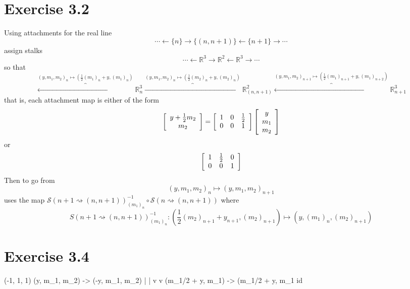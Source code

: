 \documentclass{letter}
\begin{document}
  \section*{Exercise 3.2}
  Using attachments for the real line
  $$
  \cdots \longleftarrow \{n\} \longrightarrow \{(n, n+1)\} \longleftarrow \{n+1\} \longrightarrow \cdots
  $$
  assign stalks
  $$
  \cdots \longleftarrow \mathbb{R}^3 \longrightarrow \mathbb{R}^2 
         \longleftarrow \mathbb{R}^3 \longrightarrow \cdots
  $$
  so that
  $$
  \overbrace{\longleftarrow}^{(y, m_1, m_2)_n \mapsto \left(\frac{1}{2}(m_1)_n + y, (m_1)_n\right)}
  \mathbb{R}^{3}_n
  \overbrace{\longrightarrow}^{(y, m_1, m_2)_n \mapsto \left(\frac{1}{2}(m_2)_n + y, (m_2)_n\right)}
  \mathbb{R}^{2}_{(n, n+1)}
  \overbrace{\longleftarrow}^{(y, m_1, m_2)_{n+1} \mapsto \left(\frac{1}{2}(m_1)_{n+1} + y, (m_1)_{n+2}\right)}
  \mathbb{R}^{3}_{n+1}
  $$
  that is, each attachment map is either of the form
  $$
  \left[\begin{array}{c}
  y + \frac{1}{2}m_2 \\ m_2
  \end{array}\right] =
  \left[\begin{array}{c c c}
  1 & 0 & \frac{1}{2} \\
  0 & 0 & 1
  \end{array}\right]
  \left[\begin{array}{c}
  y \\ m_1 \\ m_2
  \end{array}\right]
  $$
  or
  $$
  \left[\begin{array}{c c c}
  1 & \frac{1}{2} & 0 \\
  0 & 0 & 1
  \end{array}\right]
  $$
  Then to go from
  $$
  (y, m_1, m_2)_n \mapsto (y, m_1, m_2)_{n+1}
  $$
  uses the map 
  $\mathscr{S}(n+1 \rightsquigarrow (n, n+1))^{-1}_{(m_1)_n} \circ 
     \mathscr{S}(n \rightsquigarrow (n, n+1))$
  where
  $$
  S(n+1 \rightsquigarrow (n,n+1))^{-1}_{(m_1)_n}
    :       (\frac{1}{2} (m_2)_{n+1} + y_{n+1}, (m_2)_{n+1}) 
    \mapsto (y, (m_1)_n, (m_2)_{n+1})
  $$
 
  \section*{Exercise 3.4} 
                  (-1, 1, 1)
  (y, m_1, m_2)    -> (-y, m_1, m_2)
     |                     |
     v                     v
  (m_1/2 + y, m_1) -> (m_1/2 + y, m_1
                   id
\end{document}
